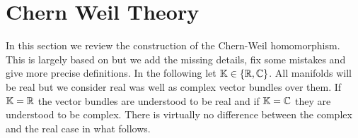 \section{Chern Weil Theory}

In this section we review the construction of the Chern-Weil homomorphism. This is largely based on \cite{emilia_globale_ana} but we add the missing details, fix some mistakes and give more precise definitions. In the following let $\mathbb{K} \in \{\mathbb{R}, \mathbb{C}\}$. All manifolds will be real but we consider real was well as complex vector bundles over them. If $\mathbb{K} =  \mathbb{R}$ the vector bundles are understood to be real and if $\mathbb{K} =  \mathbb{C}$ they are understood to be complex. There is virtually no difference between the complex and the real case in what follows. 





